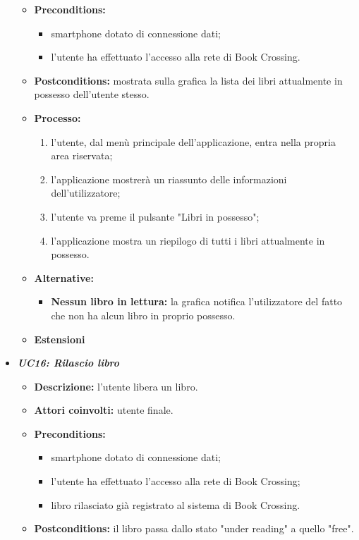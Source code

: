 \begin{itemize}
\begin{itemize}
		\item \textbf{Preconditions:}
		\begin{itemize}
			\item smartphone dotato di connessione dati;
			\item l’utente ha effettuato l’accesso alla rete di Book Crossing.
		\end{itemize}
		\item \textbf{Postconditions:} mostrata sulla grafica la lista dei libri attualmente in possesso dell'utente stesso. 
		\item \textbf{Processo:}
		\begin{enumerate}
			\item l'utente, dal menù principale dell'applicazione, entra nella propria area riservata;
			\item l'applicazione mostrerà un riassunto delle informazioni dell'utilizzatore;
			\item l'utente va preme il pulsante "Libri in possesso";
			\item l'applicazione mostra un riepilogo di tutti i libri attualmente in possesso.
		\end{enumerate}
		\item \textbf{Alternative:}
		\begin{itemize}
			\item \textbf{Nessun libro in lettura:} la grafica notifica l'utilizzatore del fatto che non ha alcun libro in proprio possesso.
		\end{itemize}
		\item \textbf{Estensioni}
	\end{itemize}
	\item \textbf{\textit{UC16: Rilascio libro}}
	\begin{itemize}
		\item \textbf{Descrizione:} l'utente libera un libro.
		\item \textbf{Attori coinvolti:} utente finale.
		\item \textbf{Preconditions:}
		\begin{itemize}
			\item smartphone dotato di connessione dati;
			\item l’utente ha effettuato l’accesso alla rete di Book Crossing;
			\item libro rilasciato già registrato al sistema di Book Crossing.
		\end{itemize}
		\item \textbf{Postconditions:} il libro passa dallo stato "under reading" a quello "free".

\end{itemize}
\end{itemize}
